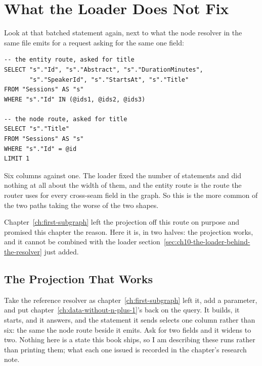 \section{What the Loader Does Not Fix}
\label{sec:ch10-what-the-loader-does-not-fix}

%
Look at that batched statement again, next to what the node resolver in the
same file emits for a request asking for the same one field:

\begin{verbatim}
-- the entity route, asked for title
SELECT "s"."Id", "s"."Abstract", "s"."DurationMinutes",
       "s"."SpeakerId", "s"."StartsAt", "s"."Title"
FROM "Sessions" AS "s"
WHERE "s"."Id" IN (@ids1, @ids2, @ids3)

-- the node route, asked for title
SELECT "s"."Title"
FROM "Sessions" AS "s"
WHERE "s"."Id" = @id
LIMIT 1
\end{verbatim}

%
Six columns against one. The loader fixed the number of statements and did
nothing at all about the width of them, and the entity route is the route the
router uses for every cross-seam field in the graph. So this is the more common
of the two paths taking the worse of the two shapes.

%
Chapter~\ref{ch:first-subgraph} left the projection off this route on purpose
and promised this chapter the reason. Here it is, in two halves: the
projection works, and it cannot be combined with the loader
section~\ref{sec:ch10-the-loader-behind-the-resolver} just added.

\subsection{The Projection That Works}

%
Take the reference resolver as chapter~\ref{ch:first-subgraph} left it, add a
 parameter, and put chapter~\ref{ch:data-without-n-plus-1}'s
 back on the query. It builds, it starts, and it answers,
and the statement it sends selects one column rather than six: the same
 the node route beside it emits. Ask for two fields and
it widens to two. Nothing here is a state this book ships, so I am describing
these runs rather than printing them; what each one issued is recorded in the
chapter's research note.

